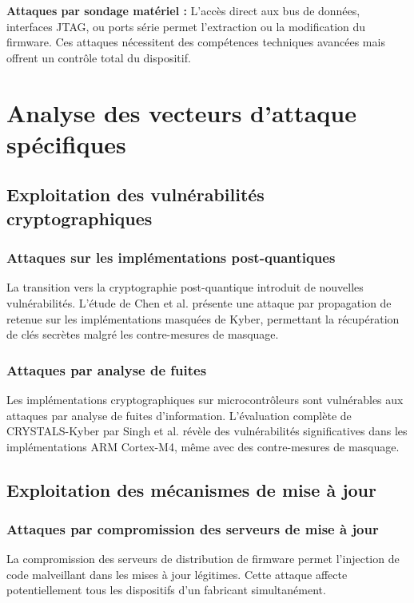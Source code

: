 \textbf{Attaques par sondage matériel :} L'accès direct aux bus de données, interfaces JTAG, ou ports série permet l'extraction ou la modification du firmware. Ces attaques nécessitent des compétences techniques avancées mais offrent un contrôle total du dispositif.

\section{Analyse des vecteurs d'attaque spécifiques}

\subsection{Exploitation des vulnérabilités cryptographiques}

\subsubsection{Attaques sur les implémentations post-quantiques}

La transition vers la cryptographie post-quantique introduit de nouvelles vulnérabilités. L'étude de Chen et al. \cite{Chen2024CarryFault} présente une attaque par propagation de retenue sur les implémentations masquées de Kyber, permettant la récupération de clés secrètes malgré les contre-mesures de masquage.

\subsubsection{Attaques par analyse de fuites}

Les implémentations cryptographiques sur microcontrôleurs sont vulnérables aux attaques par analyse de fuites d'information. L'évaluation complète de CRYSTALS-Kyber par Singh et al. \cite{Singh2024KyberLeakage} révèle des vulnérabilités significatives dans les implémentations ARM Cortex-M4, même avec des contre-mesures de masquage.

\subsection{Exploitation des mécanismes de mise à jour}

\subsubsection{Attaques par compromission des serveurs de mise à jour}

La compromission des serveurs de distribution de firmware permet l'injection de code malveillant dans les mises à jour légitimes. Cette attaque affecte potentiellement tous les dispositifs d'un fabricant simultanément.

